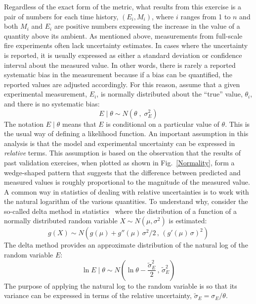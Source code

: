 \documentclass[fleqn,b5paper]{article}
\begin{document}
Regardless of the exact form of the metric, what results from this exercise is a pair of numbers for each time history, $(E_i,M_i)$, where $i$ ranges from 1 to $n$ and both $M_i$ and $E_i$ are positive numbers expressing the increase in the value of a quantity above its ambient. As mentioned above, measurements from full-scale fire experiments often lack uncertainty estimates. In cases where the uncertainty is reported, it is usually expressed as either a standard deviation or confidence interval about the measured value. In other words, there is rarely a reported systematic bias in the measurement because if a bias can be quantified, the reported values are adjusted accordingly. For this reason, assume that a given experimental measurement, $E_i$, is normally distributed about the ``true'' value, $\theta_i$, and there is no systematic bias:
\begin{equation}
   E \; | \; \theta \sim N(\theta \; , \; \sigma_E^2) \label{expunc}
\end{equation}
The notation $E \; | \; \theta$ means that $E$ is conditional on a particular value of $\theta$. This is the usual way of defining a likelihood function. An important assumption in this analysis is that the model and experimental uncertainty can be expressed in {\em relative} terms. This assumption is based on the observation that the results of past validation exercises, when plotted as shown in Fig.~\ref{Normality}, form a wedge-shaped pattern that suggests that the difference between predicted and measured values is roughly proportional to the magnitude of the measured value. A common way in statistics of dealing with relative uncertainties is to work with the natural logarithm of the various quantities. To understand why, consider the so-called delta method in statistics~\cite{Oehlert:1992} where the distribution of a function of a normally distributed random variable $X \sim N(\mu,\sigma^2)$ is estimated:
\[g(X) \sim N \left( g(\mu) + g''(\mu) \, \sigma^2/2 \, , \, (g'(\mu) \, \sigma)^2\right)\]
The delta method provides an approximate distribution of the natural log of the random variable $E$:
\begin{equation}
   \ln E \; | \; \theta \sim N \left( \ln \theta - \frac{\widetilde{\sigma}_E^2}{2} \, , \,\widetilde{\sigma}_E^2 \right) \label{eeq}
\end{equation}
The purpose of applying the natural log to the random variable is so that its variance can be expressed in terms of the relative uncertainty, $\widetilde{\sigma}_E=\sigma_E/\theta$.
\end{document}
